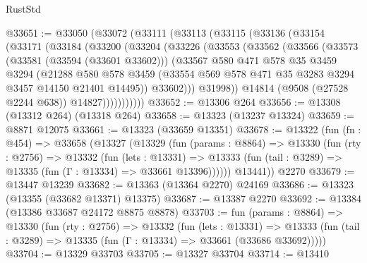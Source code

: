 \begin{lexlean}{RustStd}
\begin{coremodule}
@33651 := @33050
    (@33072
      (@33111
        (@33113
          (@33115
            (@33136
              (@33154
                (@33171
                  (@33184
                    (@33200
                      (@33204
                        (@33226
                          (@33553
                            (@33562
                              (@33566
                                (@33573
                                  (@33581 (@33594 (@33601 @33602)))
                                  (@33567
                                    @580
                                    @471
                                    @578
                                    @35
                                    @3459
                                    @3294
                                    (@21288
                                      @580
                                      @578
                                      @3459
                                      (@33554
                                        @569
                                        @578
                                        @471
                                        @35
                                        @3283
                                        @3294
                                        @3457
                                        @14150
                                        @21401
                                        @14495))
                                    @33602)))
                              @31998))
                          @14814
                          (@9508 (@27528 @2244 @638))
                          @14827)))))))))))
@33652 := @13306 @264
@33656 := @13308 (@13312 @264) (@13318 @264)
@33658 := @13323 (@13237 @13324)
@33659 := @8871 @12075
@33661 := @13323 (@33659 @13351)
@33678 := @13322
    (fun (fn : @454) =>
    @33658
      (@13327
        (@13329
          (fun (params : @8864) =>
          @13330
            (fun (rty : @2756) =>
            @13332
              (fun (lets : @13331) =>
              @13333 (fun (tail : @3289) => @13335 (fun (Γ : @13334) => @33661 @13396))))))
        @13441))
    @2270
@33679 := @13447 @13239
@33682 := @13363 (@13364 @2270) @24169
@33686 := @13323 (@13355 (@33682 @13371) @13375)
@33687 := @13387 @2270
@33692 := @13384 (@13386 @33687 @24172 @8875 @8878)
@33703 := fun (params : @8864) =>
  @13330
    (fun (rty : @2756) =>
    @13332
      (fun (lets : @13331) =>
      @13333 (fun (tail : @3289) => @13335 (fun (Γ : @13334) => @33661 (@33686 @33692)))))
@33704 := @13329 @33703
@33705 := @13327 @33704
@33714 := @13410

\end{coremodule}
\end{lexlean}
